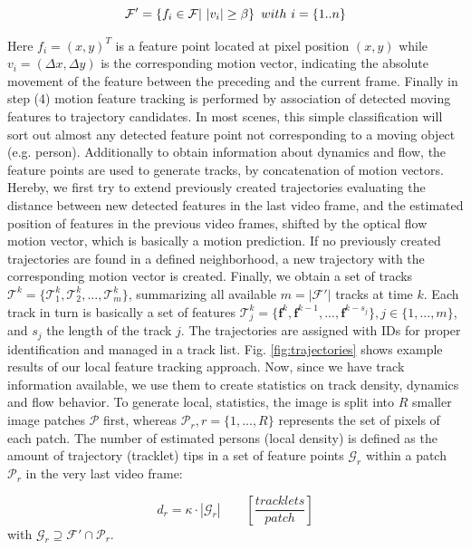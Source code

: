\documentclass[a4paper, 10pt, journal]{wissarbIEEE}      %
\begin{document}
\begin{equation}
	\mathcal{F'} = \{f_i\in \mathcal{F} | \ |v_i| \ge \beta\} \hskip 5pt {with} \ i = \{1..n\}
\end{equation}

Here $f_i=(x,y)^T$ is a feature point located at pixel position $(x,y)$ while $v_i=(\Delta x,\Delta y)$ is the corresponding motion vector, indicating the absolute movement of the feature between the preceding and the current frame. Finally in step (4) motion feature tracking is performed by association of detected moving features to trajectory candidates. In most scenes, this simple classiﬁcation will sort out almost any detected feature point not corresponding to a moving object (e.g. person). Additionally to obtain information about dynamics and flow, the feature points are used to generate tracks, by concatenation of motion vectors. Hereby, we first try to extend previously created trajectories evaluating the distance between new detected features in the last video frame, and the estimated position of features in the previous video frames, shifted by the optical flow motion vector, which is basically a motion prediction. If no previously created trajectories are found in a defined neighborhood, a new trajectory with the corresponding motion vector is created. Finally, we obtain a set of tracks $\mathcal{T}^k = \{\mathcal{T}_1^k, \mathcal{T}_2^k, ..., \mathcal{T}_m^k\}$, summarizing all available $m = |\mathcal{F'}|$ tracks at time $k$. Each track in turn is basically a set of features $\mathcal{T}_j^k = \{ \mathbf{f}^k, \mathbf{f}^{k-1}, ..., \mathbf{f}^{k-s_j}\}, j\in\{1, ..., m\}$, and $s_j$ the length of the track $j$. 
 The trajectories are assigned with IDs for proper identification and managed in a track list. Fig. \ref{fig:trajectories} shows example results of our local feature tracking approach. Now, since we have track information available, we use them to create statistics on track density, dynamics and flow behavior. To generate local, statistics, the image is split into $R$ smaller image patches $\mathcal{P}$ first, whereas $\mathcal{P}_r, r = \{1, ..., R\}$ represents the set of pixels of each patch. The number of estimated persons (local density) is defined as the amount of trajectory (tracklet) tips in a set of feature points $\mathcal{G}_r$ within a patch $\mathcal{P}_r$ in the very last video frame:

\begin{equation}
	d_r = \kappa\cdot|\mathcal{G}_r| \ \ \ \ \ \ \ \ \ [\frac{tracklets}{patch}]
\end{equation}
with $\mathcal{G}_r \supseteq \mathcal{F′}\cap \mathcal{P}_r$.\\
\end{document}
